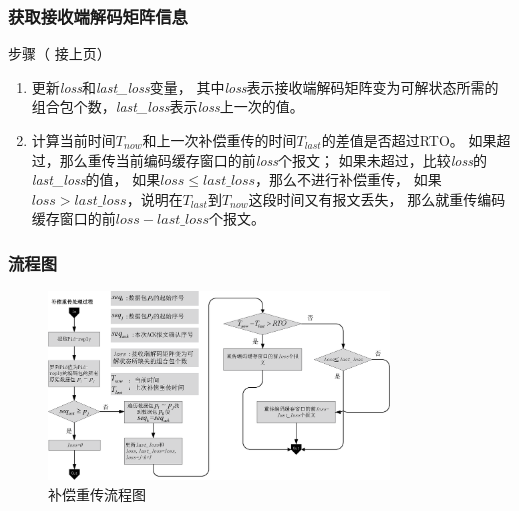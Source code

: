 \begin{frame}
		\frametitle{获取接收端解码矩阵信息}
		\begin{block}{步骤（ 接上页）}
		\begin{enumerate}[<+-|alert@+>]
	\addtocounter{enumi}{3}
				\item 更新\emph{loss}和\emph{last\_loss}变量，
	其中\emph{loss}表示接收端解码矩阵变为可解状态所需的组合包个数，\emph{last\_loss}表示\emph{loss}上一次的值。
	\item  计算当前时间$T_{now}$和上一次补偿重传的时间$T_{last}$的差值是否超过RTO。
	如果超过，那么重传当前编码缓存窗口的前\emph{loss}个报文；
	如果未超过，比较\emph{loss}的\emph{last\_loss}的值，
	如果$loss \le last\_loss$，那么不进行补偿重传，
	如果$loss > last\_loss$，说明在$T_{last}$到$T_{now}$这段时间又有报文丢失，
	那么就重传编码缓存窗口的前$loss-last\_loss$个报文。
		\end{enumerate}
		\end{block}
\end{frame}

\begin{frame}
	\frametitle{流程图}
	\begin{figure}
		\hspace{-1.5em}
		\includegraphics[height=5cm]{../figures/bccc.eps}
		\caption{补偿重传流程图}
		\label{fig:buchang}
	\end{figure}
\end{frame}
